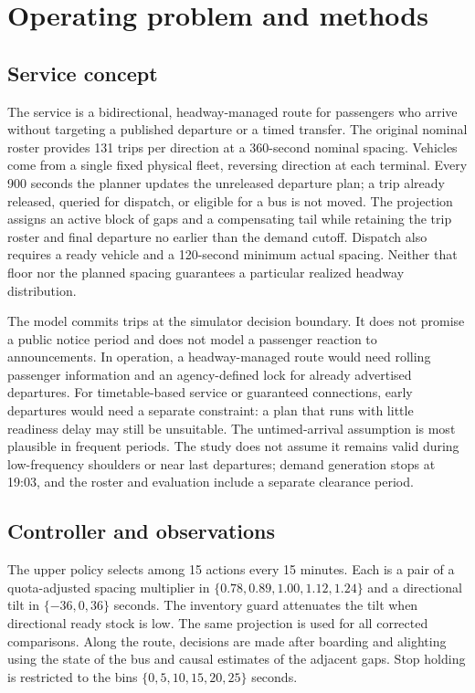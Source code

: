 \section{Operating problem and methods}

\subsection{Service concept}
The service is a bidirectional, headway-managed route for passengers who arrive without targeting a published departure or a timed transfer. The original nominal roster provides 131 trips per direction at a 360-second nominal spacing. Vehicles come from a single fixed physical fleet, reversing direction at each terminal. Every 900 seconds the planner updates the unreleased departure plan; a trip already released, queried for dispatch, or eligible for a bus is not moved. The projection assigns an active block of gaps and a compensating tail while retaining the trip roster and final departure no earlier than the demand cutoff. Dispatch also requires a ready vehicle and a 120-second minimum actual spacing. Neither that floor nor the planned spacing guarantees a particular realized headway distribution.

The model commits trips at the simulator decision boundary. It does not promise a public notice period and does not model a passenger reaction to announcements. In operation, a headway-managed route would need rolling passenger information and an agency-defined lock for already advertised departures. For timetable-based service or guaranteed connections, early departures would need a separate constraint: a plan that runs with little readiness delay may still be unsuitable. The untimed-arrival assumption is most plausible in frequent periods. The study does not assume it remains valid during low-frequency shoulders or near last departures; demand generation stops at 19:03, and the roster and evaluation include a separate clearance period.

\subsection{Controller and observations}
The upper policy selects among 15 actions every 15 minutes. Each is a pair of a quota-adjusted spacing multiplier in $\{0.78,0.89,1.00,1.12,1.24\}$ and a directional tilt in $\{-36,0,36\}$ seconds. The inventory guard attenuates the tilt when directional ready stock is low. The same projection is used for all corrected comparisons. Along the route, decisions are made after boarding and alighting using the state of the bus and causal estimates of the adjacent gaps. Stop holding is restricted to the bins $\{0,5,10,15,20,25\}$ seconds.

